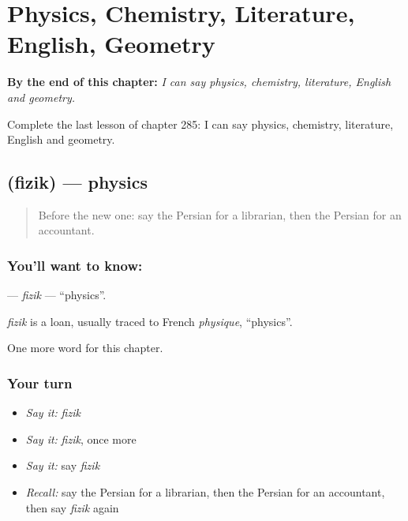 
\chapter{Physics, Chemistry, Literature, English, Geometry}
\label{ch:fa-physics-chemistry-literature-english-geometry}

\begin{chapteropening}
\textbf{By the end of this chapter:} \emph{I can say physics, chemistry, literature, English and geometry.}

Complete the last lesson of chapter 285: I can say physics, chemistry, literature, English and geometry.
\end{chapteropening}

\section[\texorpdfstring{\fa{فیزیک} (fizik)}{فیزیک (fizik)}]{ (fizik) — physics}

\label{lesson:FA-C285-fizik}



\begin{quote}
Before the new one: say the Persian for a librarian, then the Persian for an accountant.
\end{quote}

\subsection*{You'll want to know: }
\textbf{} — \emph{fizik} — \textquotedblleft{}physics\textquotedblright{}.

\begin{cousinweb}
\emph{fizik} is a loan, usually traced to French \emph{physique}, \textquotedblleft{}physics\textquotedblright{}.
\end{cousinweb}

\begin{grammarlens}[title={What you've built}]
One more word for this chapter.
\end{grammarlens}

\subsection*{Your turn}
\begin{itemize}
\raggedright
  \item \emph{Say it:} \emph{fizik}
  \item \emph{Say it:} \emph{fizik}, once more
  \item \emph{Say it:} say \emph{fizik}
  \item \emph{Recall:} say the Persian for a librarian, then the Persian for an accountant, then say \emph{fizik} again
\end{itemize}

